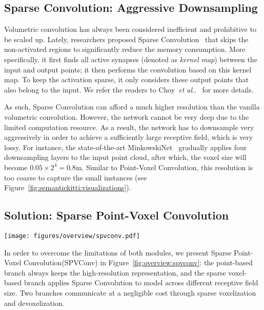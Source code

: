 \documentclass[runningheads]{llncs}
\makeatletter
\newcommand{\fig}[1]{Figure~\ref{#1}}
\DeclareRobustCommand\onedot{\futurelet\@let@token\@onedot}
\def\@onedot{\ifx\@let@token.\else.\null\fi\xspace}
\def\etal{\emph{et al}\onedot}
\def\module{Sparse Point-Voxel Convolution\xspace}
\def\moduleshort{SPVConv\xspace}
\makeatother
\begin{document}
\subsection{Sparse Convolution: Aggressive Downsampling}

Volumetric convolution has always been considered inefficient and prohibitive to be scaled up. Lately, researchers proposed Sparse Convolution~\cite{graham20183d,choy20194d} that skips the non-activated regions to significantly reduce the memory consumption. More specifically, it first finds all active synapses (denoted as \textit{kernel map}) between the input and output points; it then performs the convolution based on this kernel map. To keep the activation sparse, it only considers these output points that also belong to the input. We refer the readers to Choy~\etal~\cite{choy20194d} for more details.

As such, Sparse Convolution can afford a much higher resolution than the vanilla volumetric convolution. However, the network cannot be very deep due to the limited computation resource. As a result, the network has to downsample very aggressively in order to achieve a sufficiently large receptive field, which is very lossy. For instance, the state-of-the-art MinkowskiNet~\cite{choy20194d} gradually applies four downsampling layers to the input point cloud, after which, the voxel size will become $0.05 \times 2^4 = 0.8$m. Similar to Point-Voxel Convolution, this resolution is too coarse to capture the small instances (see \fig{fig:semantickitti:visualizations}).

\subsection{Solution: \module}

\begin{figure*}[t]
\centering
\texttt{[image: figures/overview/spvconv.pdf]}
\caption{Overview of \module (\moduleshort): it equips the sparse voxel-based branch with a lightweight, high-resolution point-based branch which can capture fine details in large scenes.}
\label{fig:overview:spvconv}
\end{figure*} 
In order to overcome the limitations of both modules, we present \module (\moduleshort) in \fig{fig:overview:spvconv}: the point-based branch always keeps the high-resolution representation, and the sparse voxel-based branch applies Sparse Convolution to model across different receptive field size. Two branches communicate at a negligible cost through sparse voxelization and devoxelization.
\end{document}
